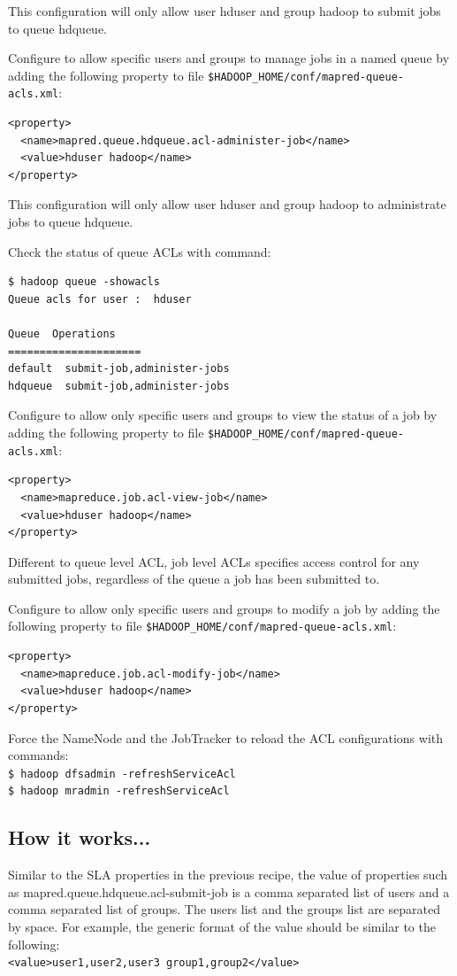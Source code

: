 This configuration will only allow user hduser and group hadoop to submit jobs to queue hdqueue.

Configure to allow specific users and groups to manage jobs in a named queue by adding the following property to file \verb|$HADOOP_HOME/conf/mapred-queue-acls.xml|:
\lstset{style=bashstyle}
\begin{lstlisting}
<property>
  <name>mapred.queue.hdqueue.acl-administer-job</name>
  <value>hduser hadoop</name>
</property>
\end{lstlisting}

This configuration will only allow user hduser and group hadoop to administrate jobs to queue hdqueue.

Check the status of queue ACLs with command:
\lstset{style=bashstyle}
\begin{lstlisting}
$ hadoop queue -showacls
Queue acls for user :  hduser

Queue  Operations
=====================
default  submit-job,administer-jobs
hdqueue  submit-job,administer-jobs
\end{lstlisting}

Configure to allow only specific users and groups to view the status of a job by adding the following property to file \verb|$HADOOP_HOME/conf/mapred-queue-acls.xml|:
\lstset{style=bashstyle}
\begin{lstlisting}
<property>
  <name>mapreduce.job.acl-view-job</name>
  <value>hduser hadoop</name>
</property>
\end{lstlisting}

Different to queue level ACL, job level ACLs specifies access control for any submitted jobs, regardless of the queue a job has been submitted to.

Configure to allow only specific users and groups to modify a job by adding the following property to file \verb|$HADOOP_HOME/conf/mapred-queue-acls.xml|:
\begin{verbatim}
<property>
  <name>mapreduce.job.acl-modify-job</name>
  <value>hduser hadoop</name>
</property>
\end{verbatim}

Force the NameNode and the JobTracker to reload the ACL configurations with commands: \\
\verb|$ hadoop dfsadmin -refreshServiceAcl| \\
\verb|$ hadoop mradmin -refreshServiceAcl|

\subsection*{How it works...}
Similar to the SLA properties in the previous recipe, the value of properties such as mapred.queue.hdqueue.acl-submit-job is a comma separated list of users and a comma separated list of groups. The users list and the groups list are separated by space. For example,  the generic format of the value should be similar to the following: \\
\verb|<value>user1,user2,user3 group1,group2</value>|

